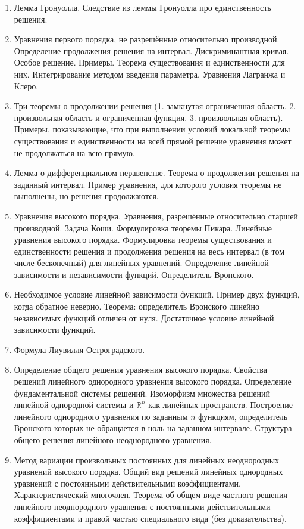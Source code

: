 \documentclass{article}
\begin{document}
\begin{enumerate}
    \item Лемма Гронуолла. Следствие из леммы Гронуолла про единственность решения.

    \item Уравнения первого порядка, не разрешённые относительно производной. Определение продолжения решения на интервал. Дискриминантная кривая. Особое решение. Примеры. Теорема существования и единственности для них. Интегрирование методом введения параметра. Уравнения Лагранжа и Клеро.
    
    \item Три теоремы о продолжении решения (1. замкнутая ограниченная область. 2. произвольная область и ограниченная функция. 3. произвольная область). Примеры, показывающие, что при выполнении условий локальной теоремы существования и единственности на всей прямой решение уравнения может не продолжаться на всю прямую.

    \item Лемма о дифференциальном неравенстве. Теорема о продолжении решения на заданный интервал. Пример уравнения, для которого условия теоремы не выполнены, но решения продолжаются.

    \item Уравнения высокого порядка. Уравнения, разрешённые относительно старшей производной. Задача Коши. Формулировка теоремы Пикара. Линейные уравнения высокого порядка. Формулировка теоремы существования и единственности решения и продолжения решения на весь интервал (в том числе бесконечный) для линейных уравнений. Определение линейной зависимости и независимости функций. Определитель Вронского.

    \item Необходимое условие линейной зависимости функций. Пример двух функций, когда обратное неверно. Теорема: определитель Вронского линейно независимых функций отличен от нуля. Достаточное условие линейной зависимости функций.

    \item Формула Лиувилля-Остроградского.

    \item Определение общего решения уравнения высокого порядка. Свойства решений линейного однородного уравнения высокого порядка. Определение фундаментальной системы решений. Изоморфизм множества решений линейной однородной системы и $\mathbb{R}^{n}$ как линейных пространств. Построение линейного однородного уравнения по заданным $n$ функциям, определитель Вронского которых не обращается в ноль на заданном интервале. Структура общего решения линейного неоднородного уравнения.

    \item Метод вариации произвольных постоянных для линейных неоднородных уравнений высокого порядка. Общий вид решений линейных однородных уравнений с постоянными действительными коэффициентами. Характеристический многочлен. Теорема об общем виде частного решения линейного неоднородного уравнения с постоянными действительными коэффициентами и правой частью специального вида (без доказательства).
\end{enumerate}
\end{document}

